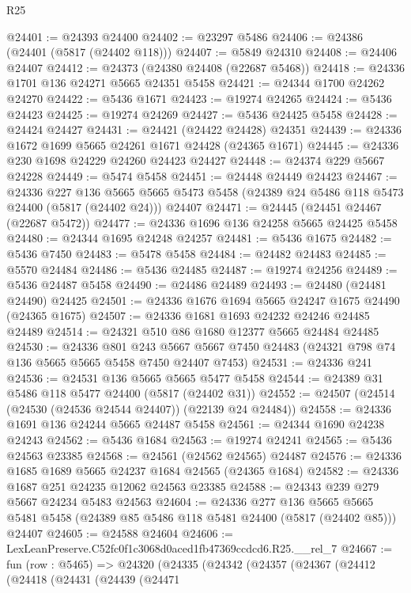 \begin{lexlean}{R25}
\begin{coremodule}
@24401 := @24393 @24400
@24402 := @23297 @5486
@24406 := @24386 (@24401 (@5817 (@24402 @118)))
@24407 := @5849 @24310
@24408 := @24406 @24407
@24412 := @24373 (@24380 @24408 (@22687 @5468))
@24418 := @24336 @1701 @136 @24271 @5665 @24351 @5458
@24421 := @24344 @1700 @24262 @24270
@24422 := @5436 @1671
@24423 := @19274 @24265
@24424 := @5436 @24423
@24425 := @19274 @24269
@24427 := @5436 @24425 @5458
@24428 := @24424 @24427
@24431 := @24421 (@24422 @24428) @24351
@24439 := @24336 @1672 @1699 @5665 @24261 @1671 @24428 (@24365 @1671)
@24445 := @24336 @230 @1698 @24229 @24260 @24423 @24427
@24448 := @24374 @229 @5667 @24228
@24449 := @5474 @5458
@24451 := @24448 @24449 @24423
@24467 := @24336
    @227
    @136
    @5665
    @5665
    @5473
    @5458
    (@24389 @24 @5486 @118 @5473 @24400 (@5817 (@24402 @24)))
    @24407
@24471 := @24445 (@24451 @24467 (@22687 @5472))
@24477 := @24336 @1696 @136 @24258 @5665 @24425 @5458
@24480 := @24344 @1695 @24248 @24257
@24481 := @5436 @1675
@24482 := @5436 @7450
@24483 := @5478 @5458
@24484 := @24482 @24483
@24485 := @5570 @24484
@24486 := @5436 @24485
@24487 := @19274 @24256
@24489 := @5436 @24487 @5458
@24490 := @24486 @24489
@24493 := @24480 (@24481 @24490) @24425
@24501 := @24336 @1676 @1694 @5665 @24247 @1675 @24490 (@24365 @1675)
@24507 := @24336 @1681 @1693 @24232 @24246 @24485 @24489
@24514 := @24321 @510 @86 @1680 @12377 @5665 @24484 @24485
@24530 := @24336
    @801
    @243
    @5667
    @5667
    @7450
    @24483
    (@24321 @798 @74 @136 @5665 @5665 @5458 @7450 @24407 @7453)
@24531 := @24336 @241
@24536 := @24531 @136 @5665 @5665 @5477 @5458
@24544 := @24389 @31 @5486 @118 @5477 @24400 (@5817 (@24402 @31))
@24552 := @24507 (@24514 (@24530 (@24536 @24544 @24407)) (@22139 @24 @24484))
@24558 := @24336 @1691 @136 @24244 @5665 @24487 @5458
@24561 := @24344 @1690 @24238 @24243
@24562 := @5436 @1684
@24563 := @19274 @24241
@24565 := @5436 @24563 @23385
@24568 := @24561 (@24562 @24565) @24487
@24576 := @24336 @1685 @1689 @5665 @24237 @1684 @24565 (@24365 @1684)
@24582 := @24336 @1687 @251 @24235 @12062 @24563 @23385
@24588 := @24343 @239 @279 @5667 @24234 @5483 @24563
@24604 := @24336
    @277
    @136
    @5665
    @5665
    @5481
    @5458
    (@24389 @85 @5486 @118 @5481 @24400 (@5817 (@24402 @85)))
    @24407
@24605 := @24588 @24604
@24606 := LexLeanPreserve.C52fc0f1c3068d0aced1fb47369ccdcd6.R25.__rel_7
@24667 := fun (row : @5465) =>
  @24320
    (@24335
      (@24342
        (@24357
          (@24367
            (@24412
              (@24418
                (@24431
                  (@24439
                    (@24471

\end{coremodule}
\end{lexlean}
